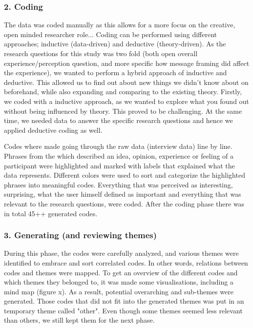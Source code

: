     \subsubsection{2. Coding}
    The data was coded manually as this allows for a more focus on the creative, open minded researcher role... 
   Coding can be performed using different approaches; inductive (data-driven) and deductive (theory-driven). As the research questions for this study was two fold (both open overall experience/perception question, and more specific how message framing did affect the experience), we wanted to perform a hybrid approach of inductive and deductive. This allowed us to find out about new things we didn't know about on beforehand, while also expanding and comparing to the existing theory. 
   Firstly, we coded with a inductive approach, as we wanted to explore what you found out without being influenced by theory.  This proved to be challenging. At the same time, we needed data to answer the specific research questions and hence we applied deductive coding as well. 
    
    Codes where made going through the raw data (interview data) line by line. Phrases from the which described an idea, opinion, experience or feeling of a participant were highlighted and marked with labels that explained what the data represents. Different colors were used to sort and categorize the highlighted phrases into meaningful codes. Everything that was perceived as interesting, surprising, what the user himself defined as important and everything that was relevant to the research questions, were coded.  After the coding phase there was in total 45++ generated codes.  
    \subsubsection{3. Generating (and reviewing themes)}
During this phase, the codes were carefully analyzed, and various themes were identified to embrace and sort correlated codes. In other words, relations between codes and themes were mapped. To get an overview of the different codes and which themes they belonged to, it was made some visualisations, including a mind map (figure x). As a result, potential overarching and sub-themes were generated. Those codes that did not fit into the generated themes was put in an temporary theme called "other". Even though some themes seemed less relevant than others, we still kept them for the next phase. 

